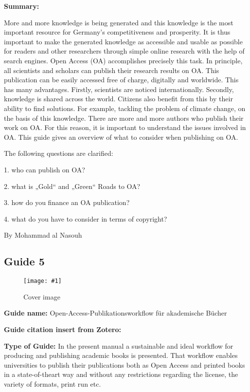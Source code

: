 \documentclass{article}
\newlength{\imgwidth}
\newcommand\scaledgraphics[2]{%
                
\settowidth{\imgwidth}{\texttt{[image: \#1]}}%
                
\setlength{\imgwidth}{\minof{\imgwidth}{#2\textwidth}}%
                
\texttt{[image: \#1]}%
                
}
\begin{document}
\textbf{Summary:}


More and more knowledge is being generated and this knowledge is the most important resource for Germany's competitiveness and prosperity. It is thus important to make the generated knowledge as accessible and usable as possible for readers and other researchers through simple online research with the help of search engines. Open Access (OA) accomplishes precisely this task. In principle, all scientists and scholars can publish their research results on OA. This publication can be easily accessed free of charge, digitally and worldwide. This has many advantages. Firstly, scientists are noticed internationally. Secondly, knowledge is shared across the world. Citizens also benefit from this by their ability to find solutions. For example, tackling the problem of climate change, on the basis of this knowledge. There are more and more authors who publish their work on OA. For this reason, it is important to understand the issues involved in OA. This guide gives an overview of what to consider when publishing on OA.


The following questions are clarified:


1. who can publish on OA?


2. what is „Gold“ and „Green“ Roads to OA?


3. how do you finance an OA publication?


4. what do you have to consider in terms of copyright?


By Mohammad al Nasouh 


\subsection{Guide 5}\label{H6691479}



\begin{center}
\begin{figure}
\scaledgraphics{39363ae5-01d9-4e5a-a46f-bf20971df65a.jpg}{0.5}
\caption*{Cover image}\label{F7674061}
\end{figure}


\end{center}


\textbf{Guide name:}  Open-Access-Publikationsworkflow für akademische Bücher


\textbf{Guide citation insert from Zotero: }\autocite{bohm_open-access-publikationsworkflow_2020}


\textbf{Type of Guide: }In the present manual a sustainable and ideal workflow for producing and publishing academic books is presented. That workflow enables universities to publish their publications both as Open Access and printed books in a state-of-theart way and without any restrictions regarding the license, the variety of formats, print run etc.
\end{document}
